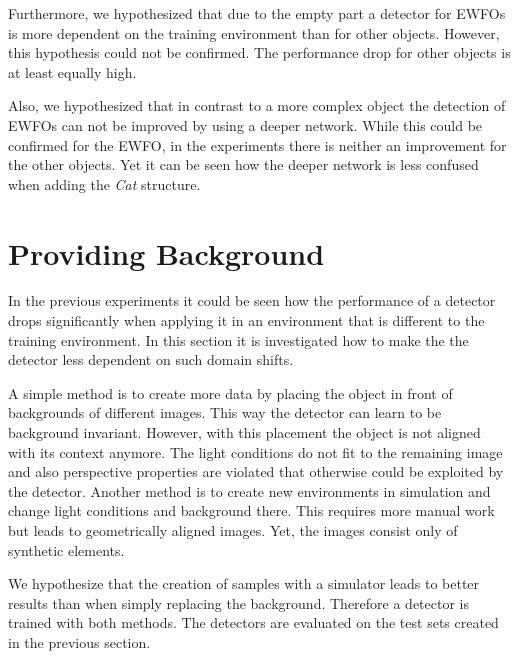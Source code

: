 Furthermore, we hypothesized that due to the empty part a detector for \acp{EWFO} is more dependent on the training environment than for other objects. However, this hypothesis could not be confirmed. The performance drop for other objects is at least equally high. 

Also, we hypothesized that in contrast to a more complex object the detection of \acp{EWFO} can not be improved by using a deeper network. While this could be confirmed for the \ac{EWFO}, in the experiments there is neither an improvement for the other objects. Yet it can be seen how the deeper network is less confused when adding the \textit{Cat} structure.

\section{Providing Background}

In the previous experiments it could be seen how the performance of a detector drops significantly when applying it in an environment that is different to the training environment. In this section it is investigated how to make the the detector less dependent on such domain shifts.

A simple method is to create more data by placing the object in front of backgrounds of different images. This way the detector can learn to be background invariant. However, with this placement the object is not aligned with its context anymore. The light conditions do not fit to the remaining image and also perspective properties are violated that otherwise could be exploited by the detector. Another method is to create new environments in simulation and change light conditions and background there. This requires more manual work but leads to geometrically aligned images. Yet, the images consist only of synthetic elements.

We hypothesize that the creation of samples with a simulator leads to better results than when simply replacing the background. Therefore a detector is trained with both methods. The detectors are evaluated on the test sets created in the previous section.

